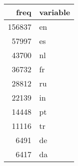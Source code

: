 \begin{table}[ht]
\centering
\begin{tabular}{rl}
  \hline
freq & variable \\ 
  \hline
156837 & en \\ 
  57997 & es \\ 
  43700 & nl \\ 
  36732 & fr \\ 
  28812 & ru \\ 
  22139 & in \\ 
  14448 & pt \\ 
  11116 & tr \\ 
  6491 & de \\ 
  6417 & da \\ 
   \hline
\end{tabular}
\end{table}
